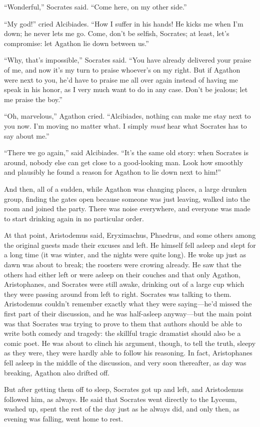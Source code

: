 “Wonderful,” Socrates said. “Come here, on my other side.”

“My god!” cried Alcibiades. “How I suffer in his hands! He kicks me when
I'm down; he never lets me go. Come, don't be selfish, Socrates; at
least, let's compromise: let Agathon lie down between us.”

“Why, that's impossible,” Socrates said. “You have already delivered
your praise of me, and now it's my turn to praise whoever's on my right.
But if Agathon were next to you, he'd have to praise me all over again
 instead of having me speak in his honor, as I very much
want to do in any case. Don't be jealous; let me praise the boy.”

“Oh, marvelous,” Agathon cried. “Alcibiades, nothing can make me stay
next to you now. I'm moving no matter what. I simply {\em must} hear
what Socrates has to say about me.”

“There we go again,” said Alcibiades. “It's the same old story: when
Socrates is around, nobody else can get close to a good-looking man.
Look  how smoothly and plausibly he found a reason for Agathon to
lie down next to him!”

And then, all of a sudden, while Agathon was changing places, a large
drunken group, finding the gates open because someone was just leaving,
walked into the room and joined the party. There was noise everywhere,
and everyone was made to start drinking again in no particular order.

At that point, Aristodemus said, Eryximachus, Phaedrus, and some 
others among the original guests made their excuses and left. He himself
fell asleep and slept for a long time (it was winter, and the nights
were quite long). He woke up just as dawn was about to break; the
roosters were crowing already. He saw that the others had either left or
were asleep on their couches and that only Agathon, Aristophanes, and
Socrates were still awake, drinking out of a large cup which they were
passing around  from left to right. Socrates was talking to them.
Aristodemus couldn't remember exactly what they were saying---he'd
missed the first part of their discussion, and he was half-asleep
anyway---but the main point was that Socrates was trying to prove to
them that authors should be able to write both comedy and tragedy: the
skillful tragic dramatist should also be a comic poet. He was about to
clinch his argument, though, to tell the truth, sleepy as they were,
they were hardly able to follow his reasoning. In fact, Aristophanes
fell asleep in the middle of the discussion, and very soon thereafter,
as day was breaking, Agathon also drifted off.

But after getting them off to sleep, Socrates got up and left, and
Aristodemus followed him, as always. He said that Socrates went directly
to the Lyceum, washed up, spent the rest of the day just as he always
did, and only then, as evening was falling, went home to rest.
\stopchapter
